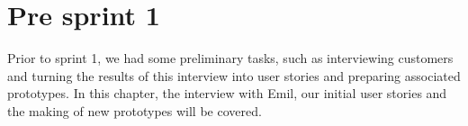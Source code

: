 \chapter{Pre sprint 1}
Prior to sprint 1, we had some preliminary tasks, such as interviewing customers and turning the results of this interview into user stories and preparing associated prototypes.
In this chapter, the interview with Emil, our initial user stories and the making of new prototypes will be covered.
